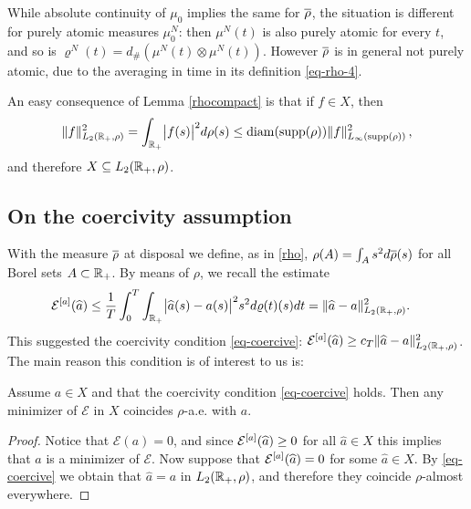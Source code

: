 \begin{remark}
	While absolute continuity of $\mu_0$ implies the same for $\overline\rho$, the situation is different for purely atomic
	measures $\mu_0^N$: then $\mu^N(t)$ is also purely atomic for every $t$, and so is
	$\varrho^N(t) = d_\# (\mu^N(t) \otimes \mu^N(t))$. However $\overline\rho$ is in general not purely atomic, due to the averaging in time in its definition \eqref{eq-rho-4}. 
\end{remark}

An easy consequence of Lemma \ref{rhocompact} is that if $f\in X$, then
\begin{align}\label{eq:inftyimplyl2}
\|f\|^2_{L_2(\mathbb{R}_+,\rho)} = \int_{\mathbb{R}_+} \bigl|f(s)\bigr|^2 d\rho(s) \leq \operatorname{diam}(\operatorname{supp}(\rho))\|f\|^2_{L_{\infty}(\operatorname{supp}(\rho))}\,,
\end{align}
and therefore $X\subseteq L_2(\mathbb{R}_+,\rho)$. 

\subsection{On the coercivity assumption}\label{sec:coerc}

With the measure $\overline\rho$ at disposal we define, as in \eqref{rho},  $\rho(A) = \int_{A} s^2 d\overline\rho(s)$ for all Borel sets $A \subset \mathbb{R}_+$. By means of $\rho$, we recall the estimate
\begin{align}
\begin{split}\label{eq-rho-3}
	\mathcal E^{[a]}(\widehat a)&\leq\frac{1}{T}\int_0^T\int_{\mathbb{R}_+}\bigl|\widehat a(s)-a(s)\bigr|^2 s^2 d\varrho(t)(s) dt = \|\widehat a-a\|^2_{L_2(\mathbb{R}_+,\rho)}.
\end{split}
\end{align}
This suggested the coercivity condition \eqref{eq-coercive}: 
	$\mathcal E^{[a]}(\widehat a)\geq c_T\|\widehat a-a\|^2_{L_2(\mathbb{R}_+,\rho)}$.
The main reason this condition is of interest to us is:

\begin{proposition}\label{uniquemin}
Assume $a \in X$ and that the coercivity condition \eqref{eq-coercive} holds. Then any minimizer of $\mathcal E$ in $X$ coincides $\rho$-a.e. with $a$.
\end{proposition}
\begin{proof}
Notice that $\mathcal E(a)=0$, and since $\mathcal E^{[a]}(\widehat a)\geq 0$ for all $\widehat a\in X$ this implies that $a$ is a minimizer of $\mathcal E$. Now suppose that $ \mathcal E^{[a]}(\widehat a)=0$ for some $\widehat a\in X$. By \eqref{eq-coercive} we obtain that $\widehat a=a$ in $L_2(\mathbb{R}_+,\rho)$, and therefore they coincide $\rho$-almost everywhere. %
\end{proof}



